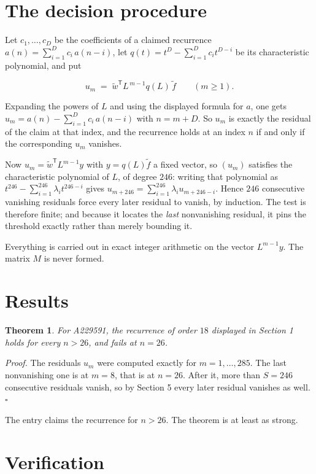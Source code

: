 \documentclass[11pt]{article}
\newtheorem{theorem}{Theorem}
\theoremstyle{definition}
\begin{document}
\section{The decision procedure}

Let $c_1,\dots,c_D$ be the coefficients of a claimed recurrence $a(n) = \sum_{i=1}^{D} c_i\,a(n-i)$, let $q(t) = t^{D} - \sum_{i=1}^{D} c_i t^{D-i}$ be its characteristic polynomial, and put

\[u_m \;=\; \tilde w^{\mathsf T} L^{\,m-1} q(L)\,\tilde f \qquad (m \ge 1).\]

Expanding the powers of $L$ and using the displayed formula for $a$, one gets $u_m = a(n) - \sum_{i=1}^{D} c_i\,a(n-i)$ with $n = m + D$. So $u_m$ is exactly the residual of the claim at that index, and the recurrence holds at an index $n$ if and only if the corresponding $u_m$ vanishes.

Now $u_m = \tilde w^{\mathsf T} L^{m-1} y$ with $y = q(L)\tilde f$ a fixed vector, so $(u_m)$ satisfies the characteristic polynomial of $L$, of degree $246$: writing that polynomial as $t^{246} - \sum_{i=1}^{246} \lambda_i t^{246-i}$ gives $u_{m+246} = \sum_{i=1}^{246} \lambda_i u_{m+246-i}$. Hence $246$ consecutive vanishing residuals force every later residual to vanish, by induction. The test is therefore finite; and because it locates the {\itshape last} nonvanishing residual, it pins the threshold exactly rather than merely bounding it.

Everything is carried out in exact integer arithmetic on the vector $L^{m-1}y$. The matrix $M$ is never formed.

\section{Results}

\begin{theorem} For A229591, the recurrence of order $18$ displayed in Section 1 holds for every $n > 26$, and fails at $n = 26$.\end{theorem}

{\itshape Proof.} The residuals $u_m$ were computed exactly for $m = 1,\dots,285$. The last nonvanishing one is at $m = 8$, that is at $n = 26$. After it, more than $S = 246$ consecutive residuals vanish, so by Section 5 every later residual vanishes as well. $\square$

The entry claims the recurrence for $n > 26$. The theorem is at least as strong.

\section{Verification}
\end{document}
